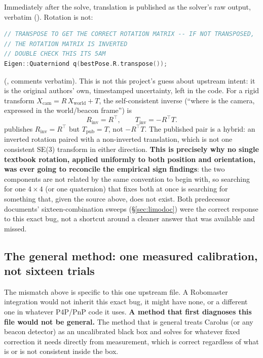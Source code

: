 Immediately after the solve, translation is published as the solver's raw
output,  verbatim
(). Rotation is not:
\begin{lstlisting}[language=C++]
// TRANSPOSE TO GET THE CORRECT ROTATION MATRIX -- IF NOT TRANSPOSED,
// THE ROTATION MATRIX IS INVERTED
// DOUBLE CHECK THIS ITS 5AM
Eigen::Quaterniond q(bestPose.R.transpose());
\end{lstlisting}
(, comments verbatim). This is not this
project's guess about upstream intent: it is the original authors' own,
timestamped uncertainty, left in the code. For a rigid transform
$X_{\text{cam}}=R\,X_{\text{world}}+T$, the self-consistent inverse (``where
is the camera, expressed in the world/beacon frame'') is
\begin{equation}
R_{\text{inv}} = R^\top, \qquad T_{\text{inv}} = -R^\top T.
\label{eq:properinv}
\end{equation}
 publishes $R_{\text{inv}}=R^\top$ but
$T_{\text{pub}}=T$, not $-R^\top T$. The published pair is a hybrid: an
inverted rotation paired with a non-inverted translation, which is not one
consistent SE(3) transform in either direction. \textbf{This is precisely why
no single textbook rotation, applied uniformly to both position and
orientation, was ever going to reconcile the empirical sign findings}: the
two components are not related by the same convention to begin with, so
searching for one $4\times4$ (or one quaternion) that fixes both at once is
searching for something that, given the source above, does not exist. Both
predecessor documents' sixteen-combination sweeps (\S\ref{sec:limodoc}) were
the correct response to this exact bug, not a shortcut around a cleaner
answer that was available and missed.

\subsection{The general method: one measured calibration, not sixteen trials}
\label{sec:quatgeneral}
The mismatch above is specific to this one upstream file. A Robomaster
integration would not inherit this exact bug, it might have none, or a
different one in whatever P4P/PnP code it uses. \textbf{A method that first
diagnoses this file would not be general.} The method that is general treats
Carolus (or any beacon detector) as an uncalibrated black box and solves for
whatever fixed correction it needs directly from measurement, which is
correct regardless of what is or is not consistent inside the box.

